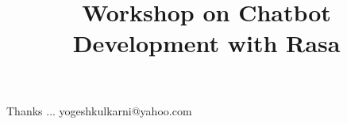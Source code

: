 \documentclass[xcolor=dvipsnames,compress,t,pdf,9pt]{beamer}
\title[\insertframenumber /\inserttotalframenumber]{Workshop on Chatbot Development with Rasa}
\begin{document}
	\begin{frame}
	\titlepage
%
	\end{frame}
	
%	
	
	
	\begin{frame}[c]{}
	Thanks ...
	\vspace{5mm}
	yogeshkulkarni@yahoo.com
	\end{frame}
\end{document}
